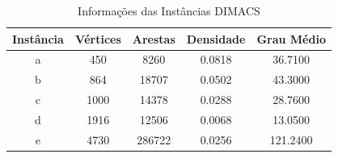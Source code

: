 \begin{table}
\centering
\caption{Informações das Instâncias DIMACS}
\label{tab:informacoes_dimacs_1}
\begin{tabular}{ccccc}
\toprule
Instância & Vértices & Arestas & Densidade & Grau Médio \\
\midrule
a & 450 & 8260 & 0.0818 & 36.7100 \\
b & 864 & 18707 & 0.0502 & 43.3000 \\
c & 1000 & 14378 & 0.0288 & 28.7600 \\
d & 1916 & 12506 & 0.0068 & 13.0500 \\
e & 4730 & 286722 & 0.0256 & 121.2400 \\
\bottomrule
\end{tabular}
\end{table}
